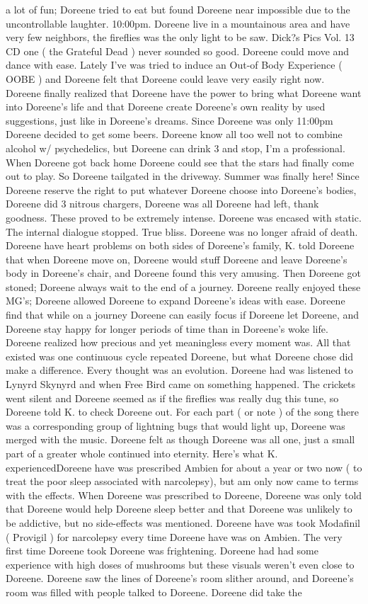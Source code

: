 \documentclass[12pt]{book}
\begin{document}
a lot of fun; Doreene tried to eat but found Doreene near impossible due to the uncontrollable laughter. 10:00pm. Doreene live in a mountainous area and have very few neighbors, the fireflies was the only light to be saw. Dick?s Pics Vol. 13 CD one ( the Grateful Dead ) never sounded so good. Doreene could move and dance with ease. Lately I've was tried to induce an Out-of Body Experience ( OOBE ) and Doreene felt that Doreene could leave very easily right now. Doreene finally realized that Doreene have the power to bring what Doreene want into Doreene's life and that Doreene create Doreene's own reality by used suggestions, just like in Doreene's dreams. Since Doreene was only 11:00pm Doreene decided to get some beers. Doreene know all too well not to combine alcohol w/ psychedelics, but Doreene can drink 3 and stop, I'm a professional. When Doreene got back home Doreene could see that the stars had finally come out to play. So Doreene tailgated in the driveway. Summer was finally here! Since Doreene reserve the right to put whatever Doreene choose into Doreene's bodies, Doreene did 3 nitrous chargers, Doreene was all Doreene had left, thank goodness. These proved to be extremely intense. Doreene was encased with static. The internal dialogue stopped. True bliss. Doreene was no longer afraid of death. Doreene have heart problems on both sides of Doreene's family, K. told Doreene that when Doreene move on, Doreene would stuff Doreene and leave Doreene's body in Doreene's chair, and Doreene found this very amusing. Then Doreene got stoned; Doreene always wait to the end of a journey. Doreene really enjoyed these MG's; Doreene allowed Doreene to expand Doreene's ideas with ease. Doreene find that while on a journey Doreene can easily focus if Doreene let Doreene, and Doreene stay happy for longer periods of time than in Doreene's woke life. Doreene realized how precious and yet meaningless every moment was. All that existed was one continuous cycle repeated Doreene, but what Doreene chose did make a difference. Every thought was an evolution. Doreene had was listened to Lynyrd Skynyrd and when Free Bird came on something happened. The crickets went silent and Doreene seemed as if the fireflies was really dug this tune, so Doreene told K. to check Doreene out. For each part ( or note ) of the song there was a corresponding group of lightning bugs that would light up, Doreene was merged with the music. Doreene felt as though Doreene was all one, just a small part of a greater whole continued into eternity. Here's what K. experiencedDoreene have was prescribed Ambien for about a year or two now ( to treat the poor sleep associated with narcolepsy), but am only now came to terms with the effects. When Doreene was prescribed to Doreene, Doreene was only told that Doreene would help Doreene sleep better and that Doreene was unlikely to be addictive, but no side-effects was mentioned. Doreene have was took Modafinil ( Provigil ) for narcolepsy every time Doreene have was on Ambien. The very first time Doreene took Doreene was frightening. Doreene had had some experience with high doses of mushrooms but these visuals weren't even close to Doreene. Doreene saw the lines of Doreene's room slither around, and Doreene's room was filled with people talked to Doreene. Doreene did take the 
\end{document}

